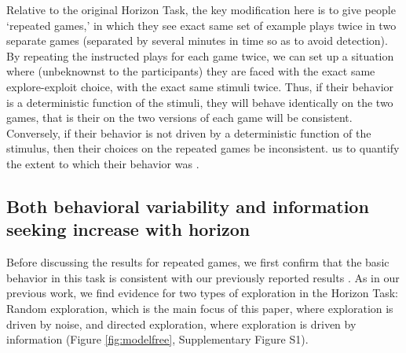 \documentclass[12pt]{article}
\begin{document}
	Relative to the original Horizon Task, the key modification here is to give people `repeated games,' in which they see exact same set of example plays twice in two separate games (separated by several minutes in time so as to avoid detection). By repeating the instructed plays for each game twice, we can set up a situation where (unbeknownst to the participants) they are faced with the exact same explore-exploit choice, with the exact same stimuli twice. Thus, if their behavior is a deterministic function of the stimuli, they will behave identically on the two games, that is their  on the two versions of each game will be consistent. Conversely, if their behavior is not driven by a deterministic function of the stimulus, then their choices on the repeated games  be inconsistent.  us to quantify the extent to which  their behavior was .
	
	
	
	
	\subsection*{Both behavioral variability and information seeking increase with horizon}
	
	Before discussing the results for repeated games, we first confirm that the basic behavior in this task is consistent with our previously reported results \citep{wilson2014}. As in our previous work, we find evidence for two types of exploration in the Horizon Task: Random exploration, which is the main focus of this paper, where exploration is driven by noise, and directed exploration, where exploration is driven by information (Figure \ref{fig:modelfree}, Supplementary Figure S1). 
	
\end{document}
